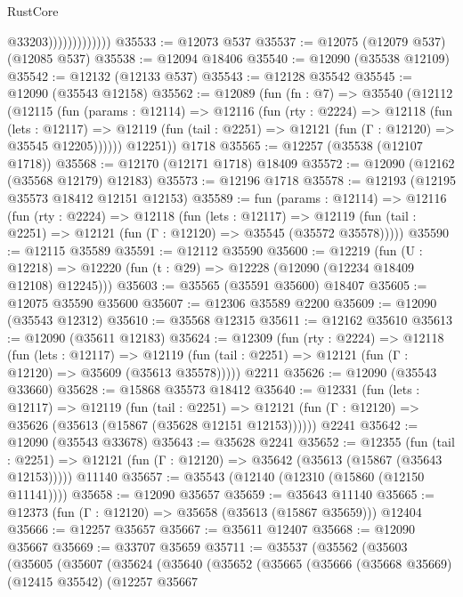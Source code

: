 \begin{lexlean}{RustCore}
\begin{coremodule}
                              @33203)))))))))))))
@35533 := @12073 @537
@35537 := @12075 (@12079 @537) (@12085 @537)
@35538 := @12094 @18406
@35540 := @12090 (@35538 @12109)
@35542 := @12132 (@12133 @537)
@35543 := @12128 @35542
@35545 := @12090 (@35543 @12158)
@35562 := @12089
    (fun (fn : @7) =>
    @35540
      (@12112
        (@12115
          (fun (params : @12114) =>
          @12116
            (fun (rty : @2224) =>
            @12118
              (fun (lets : @12117) =>
              @12119 (fun (tail : @2251) => @12121 (fun (Γ : @12120) => @35545 @12205))))))
        @12251))
    @1718
@35565 := @12257 (@35538 (@12107 @1718))
@35568 := @12170 (@12171 @1718) @18409
@35572 := @12090 (@12162 (@35568 @12179) @12183)
@35573 := @12196 @1718
@35578 := @12193 (@12195 @35573 @18412 @12151 @12153)
@35589 := fun (params : @12114) =>
  @12116
    (fun (rty : @2224) =>
    @12118
      (fun (lets : @12117) =>
      @12119 (fun (tail : @2251) => @12121 (fun (Γ : @12120) => @35545 (@35572 @35578)))))
@35590 := @12115 @35589
@35591 := @12112 @35590
@35600 := @12219
    (fun (U : @12218) => @12220 (fun (t : @29) => @12228 (@12090 (@12234 @18409 @12108) @12245)))
@35603 := @35565 (@35591 @35600) @18407
@35605 := @12075 @35590 @35600
@35607 := @12306 @35589 @2200
@35609 := @12090 (@35543 @12312)
@35610 := @35568 @12315
@35611 := @12162 @35610
@35613 := @12090 (@35611 @12183)
@35624 := @12309
    (fun (rty : @2224) =>
    @12118
      (fun (lets : @12117) =>
      @12119 (fun (tail : @2251) => @12121 (fun (Γ : @12120) => @35609 (@35613 @35578)))))
    @2211
@35626 := @12090 (@35543 @33660)
@35628 := @15868 @35573 @18412
@35640 := @12331
    (fun (lets : @12117) =>
    @12119
      (fun (tail : @2251) =>
      @12121 (fun (Γ : @12120) => @35626 (@35613 (@15867 (@35628 @12151 @12153))))))
    @2241
@35642 := @12090 (@35543 @33678)
@35643 := @35628 @2241
@35652 := @12355
    (fun (tail : @2251) => @12121 (fun (Γ : @12120) => @35642 (@35613 (@15867 (@35643 @12153)))))
    @11140
@35657 := @35543 (@12140 (@12310 (@15860 (@12150 @11141))))
@35658 := @12090 @35657
@35659 := @35643 @11140
@35665 := @12373 (fun (Γ : @12120) => @35658 (@35613 (@15867 @35659))) @12404
@35666 := @12257 @35657
@35667 := @35611 @12407
@35668 := @12090 @35667
@35669 := @33707 @35659
@35711 := @35537
    (@35562
      (@35603
        (@35605
          (@35607
            (@35624
              (@35640
                (@35652
                  (@35665
                    (@35666
                      (@35668 @35669)
                      (@12415 @35542)
                      (@12257
                        @35667

\end{coremodule}
\end{lexlean}
